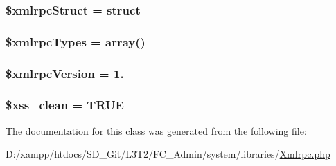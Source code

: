 \subsubsection[{\$xmlrpc\+Struct}]{\setlength{\rightskip}{0pt plus 5cm}\$xmlrpc\+Struct = \textquotesingle{}struct\textquotesingle{}}\label{class_c_i___xmlrpc_a9a499285050ed5c867eec71854231f01}
\hypertarget{class_c_i___xmlrpc_a2b937e1ca5ee8495f0251a74222cec64}{}
\subsubsection[{\$xmlrpc\+Types}]{\setlength{\rightskip}{0pt plus 5cm}\$xmlrpc\+Types = array()}\label{class_c_i___xmlrpc_a2b937e1ca5ee8495f0251a74222cec64}
\hypertarget{class_c_i___xmlrpc_a4130f55bb1f23dcabf9cf3ae5f5a746d}{}
\subsubsection[{\$xmlrpc\+Version}]{\setlength{\rightskip}{0pt plus 5cm}\$xmlrpc\+Version = \textquotesingle{}1.\textquotesingle{}}\label{class_c_i___xmlrpc_a4130f55bb1f23dcabf9cf3ae5f5a746d}
\hypertarget{class_c_i___xmlrpc_a0f2ee8861c0b3164a5c6e126dd98c0cc}{}
\subsubsection[{\$xss\+\_\+clean}]{\setlength{\rightskip}{0pt plus 5cm}\$xss\+\_\+clean = T\+R\+U\+E}\label{class_c_i___xmlrpc_a0f2ee8861c0b3164a5c6e126dd98c0cc}


The documentation for this class was generated from the following file\+:\begin{DoxyCompactItemize}
\item 
D\+:/xampp/htdocs/\+S\+D\+\_\+\+Git/\+L3\+T2/\+F\+C\+\_\+\+Admin/system/libraries/\hyperlink{_xmlrpc_8php}{Xmlrpc.\+php}\end{DoxyCompactItemize}
